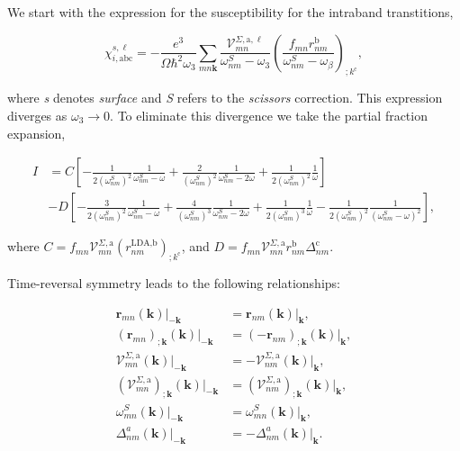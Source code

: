 \documentclass[11pt]{article}
\begin{document}
We start with the expression for the susceptibility for the intraband transtitions,

\begin{equation}\label{chii}
\chi_{i,\text{a}\text{b}\text{c}}^{s,\ell}=-\frac{e^3}{\Omega\hbar^2\omega_3}\sum_{mn\mathbf{k}}\frac{\mathcal{V}_{mn}^{\Sigma,\text{a},\ell}}{\omega^S_{nm}-\omega_3}\left(\frac{f_{mn}r_{nm}^{\text{b}}}{\omega^S_{nm}-\omega_\beta}\right)_{;k^{\text{c}}},
\end{equation} 

where \emph{s} denotes \emph{surface} and \emph{S} refers to the \emph{scissors} correction. This expression diverges as $\omega_{3} \rightarrow 0$. To eliminate this divergence we take the partial fraction expansion,

\begin{align}\label{pfi} 
I &= C \left[-\frac{1}{2(\omega^{S}_{nm})^{2}}\frac{1}{\omega^{S}_{nm}-\omega}+\frac{2}{(\omega^{S}_{nm})^{2}}\frac{1}{\omega^{S}_{nm}-2\omega}+\frac{1}{2(\omega^{S}_{nm})^{2}}\frac{1}{\omega}\right]\nonumber\\
&- D \left[-\frac{3}{2(\omega^{S}_{nm})^{2}}\frac{1}{\omega^{S}_{nm}-\omega}+\frac{4}{(\omega^{S}_{nm})^{3}}\frac{1}{\omega^{S}_{nm}-2\omega}+\frac{1}{2(\omega^{S}_{nm})^{3}}\frac{1}{\omega}-\frac{1}{2(\omega^{S}_{nm})^{2}}\frac{1}{(\omega^{S}_{nm}-\omega)^2}\right],
\end{align} 

where $C = f_{mn}\mathcal{V}^{\Sigma,\text{a}}_{mn}(r^{\text{LDA},\text{b}}_{nm})_{;k^{\text{c}}}$, and $D=f_{mn}\mathcal{V}^{\Sigma,\text{a}}_{mn}r^{\text{b}}_{nm}\Delta^{\text{c}}_{nm}$.

Time-reversal symmetry leads to the following relationships:

\begin{align}\label{time_reversal}
\mathbf{r}_{mn}(\mathbf{k})|_{-\mathbf{k}}                                          &=  \mathbf{r}_{nm}(\mathbf{k})|_{\mathbf{k}},                                      \nonumber\\
(\mathbf{r}_{mn})_{;\mathbf{k}}(\mathbf{k})|_{-\mathbf{k}}                          &=  (-\mathbf{r}_{nm})_{;\mathbf{k}}(\mathbf{k})|_{\mathbf{k}},                     \nonumber\\
\mathcal{V}^{\Sigma,\text{a}}_{mn}(\mathbf{k})|_{-\mathbf{k}}                       &=  -\mathbf{\mathcal{V}}_{nm}^{\Sigma,\text{a}}(\mathbf{k})|_{\mathbf{k}},         \nonumber\\
(\mathcal{V}^{\Sigma,\text{a}}_{mn})_{;\mathbf{k}}(\mathbf{k})|_{-\mathbf{k}}       &=  (\mathbf{\mathcal{V}}_{nm}^{\Sigma,\text{a}})_{;\mathbf{k}}(\mathbf{k})|_{\mathbf{k}},   \\
\omega_{mn}^{S}(\mathbf{k})|_{-\mathbf{k}}                                          &=  \omega_{mn}^{S}(\mathbf{k})|_{\mathbf{k}},                                      \nonumber\\
\Delta^a_{nm}(\mathbf{k})|_{-\mathbf{k}}                                            &=  -\Delta^a_{nm}(\mathbf{k})|_{\mathbf{k}}.                                       \nonumber
\end{align}
\end{document}
